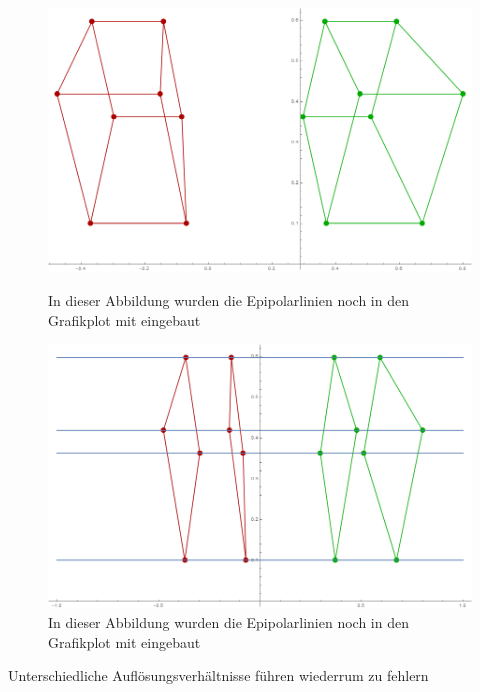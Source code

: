 \begin{figure}[!htb]
	\includegraphics[width=\linewidth]{images/Rectification_HsHrHp_different_Solutions.png}
	\caption{In dieser Abbildung wurden die Epipolarlinien noch in den Grafikplot mit eingebaut}
		\endminipage\hfill
		\includegraphics[width=\linewidth]{images/Rectification_four_different_Solutions.png}
		\caption{In dieser Abbildung wurden die Epipolarlinien noch in den Grafikplot mit eingebaut}
		\endminipage\hfill
\end{figure}

\pagebreak

Unterschiedliche Auflösungsverhältnisse führen wiederrum zu fehlern

